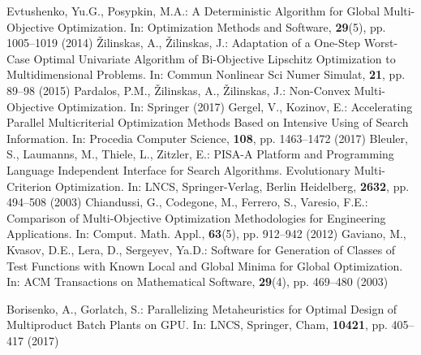 \begin{thebibliography}{}
	Evtushenko, Yu.G., Posypkin, M.A.: A Deterministic Algorithm for Global Multi-Objective Optimization. In: Optimization Methods and Software, \textbf{29}(5), pp. 1005--1019 (2014)
	{\v Z}ilinskas, A., {\v Z}ilinskas, J.: Adaptation of a One-Step Worst-Case Optimal Univariate Algorithm of Bi-Objective Lipschitz Optimization to Multidimensional Problems. In: Commun Nonlinear Sci Numer Simulat, \textbf{21}, pp. 89--98 (2015)
	Pardalos, P.M., {\v Z}ilinskas, A., {\v Z}ilinskas, J.: Non-Convex Multi-Objective Optimization. In: Springer (2017)
	Gergel, V., Kozinov, E.: Accelerating Parallel Multicriterial Optimization Methods Based on Intensive Using of Search Information. In: Procedia Computer Science, \textbf{108}, pp. 1463--1472 (2017) 
	Bleuler, S., Laumanns, M., Thiele, L., Zitzler, E.: PISA-A Platform and Programming Language Independent Interface for Search Algorithms. Evolutionary Multi-Criterion Optimization. In: LNCS, Springer-Verlag, Berlin Heidelberg, \textbf{2632}, pp. 494--508 (2003)
	Chiandussi, G., Codegone, M., Ferrero, S., Varesio, F.E.: Comparison of Multi-Objective Optimization Methodologies for Engineering Applications. In: Comput. Math. Appl., \textbf{63}(5), pp. 912--942 (2012)
	Gaviano, M., Kvasov, D.E., Lera, D., Sergeyev, Ya.D.: Software for Generation of Classes of Test Functions with Known Local and Global Minima for Global Optimization. In: ACM Transactions on Mathematical Software, \textbf{29}(4), pp. 469--480 (2003)

	Borisenko, A., Gorlatch, S.: Parallelizing Metaheuristics for Optimal Design of Multiproduct Batch Plants on GPU. In: LNCS, Springer, Cham, \textbf{10421}, pp. 405--417 (2017)
  

\end{thebibliography}




